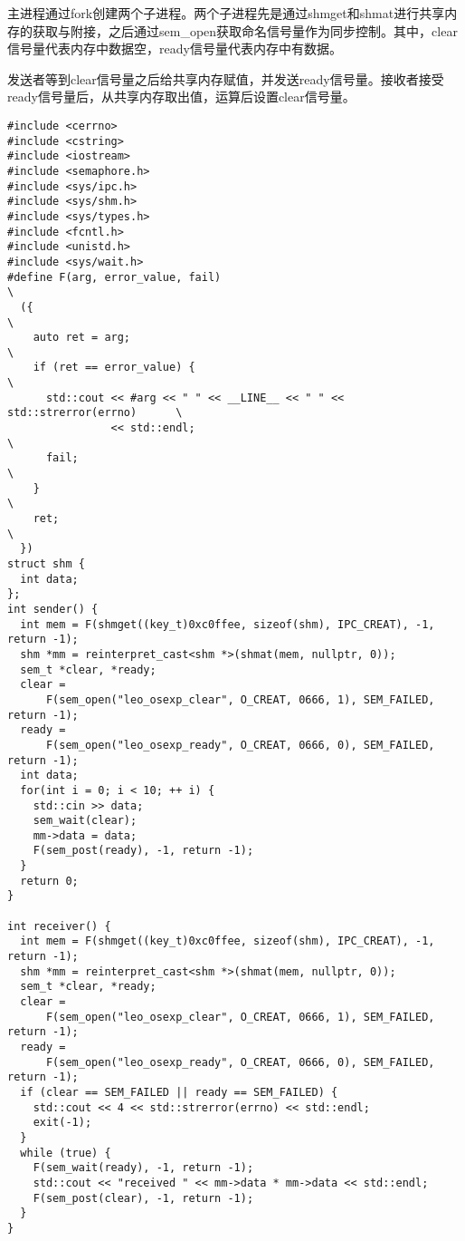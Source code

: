 \documentclass{ctexrep}
\begin{document}
主进程通过fork创建两个子进程。两个子进程先是通过shmget和shmat进行共享内存的获取与附接，之后通过sem_open获取命名信号量作为同步控制。其中，clear信号量代表内存中数据空，ready信号量代表内存中有数据。

发送者等到clear信号量之后给共享内存赋值，并发送ready信号量。接收者接受ready信号量后，从共享内存取出值，运算后设置clear信号量。

\begin{verbatim}
#include <cerrno>
#include <cstring>
#include <iostream>
#include <semaphore.h>
#include <sys/ipc.h>
#include <sys/shm.h>
#include <sys/types.h>
#include <fcntl.h>
#include <unistd.h>
#include <sys/wait.h>
#define F(arg, error_value, fail)                                              \
  ({                                                                           \
    auto ret = arg;                                                            \
    if (ret == error_value) {                                                  \
      std::cout << #arg << " " << __LINE__ << " " << std::strerror(errno)      \
                << std::endl;                                                  \
      fail;                                                                    \
    }                                                                          \
    ret;                                                                       \
  })
struct shm {
  int data;
};
int sender() {
  int mem = F(shmget((key_t)0xc0ffee, sizeof(shm), IPC_CREAT), -1, return -1);
  shm *mm = reinterpret_cast<shm *>(shmat(mem, nullptr, 0));
  sem_t *clear, *ready;
  clear =
      F(sem_open("leo_osexp_clear", O_CREAT, 0666, 1), SEM_FAILED, return -1);
  ready =
      F(sem_open("leo_osexp_ready", O_CREAT, 0666, 0), SEM_FAILED, return -1);
  int data;
  for(int i = 0; i < 10; ++ i) {
    std::cin >> data;
    sem_wait(clear);
    mm->data = data;
    F(sem_post(ready), -1, return -1);
  }
  return 0;
}

int receiver() {
  int mem = F(shmget((key_t)0xc0ffee, sizeof(shm), IPC_CREAT), -1, return -1);
  shm *mm = reinterpret_cast<shm *>(shmat(mem, nullptr, 0));
  sem_t *clear, *ready;
  clear =
      F(sem_open("leo_osexp_clear", O_CREAT, 0666, 1), SEM_FAILED, return -1);
  ready =
      F(sem_open("leo_osexp_ready", O_CREAT, 0666, 0), SEM_FAILED, return -1);
  if (clear == SEM_FAILED || ready == SEM_FAILED) {
    std::cout << 4 << std::strerror(errno) << std::endl;
    exit(-1);
  }
  while (true) {
    F(sem_wait(ready), -1, return -1);
    std::cout << "received " << mm->data * mm->data << std::endl;
    F(sem_post(clear), -1, return -1);
  }
}


\end{verbatim}
\end{document}
